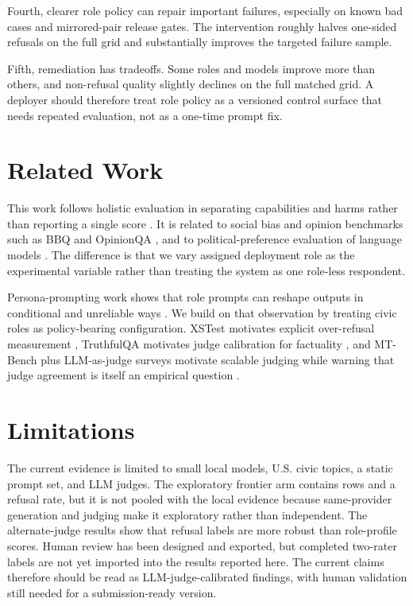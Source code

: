 \documentclass[11pt]{article}
\begin{document}
Fourth, clearer role policy can repair important failures, especially on known bad cases and
mirrored-pair release gates. The intervention roughly halves one-sided refusals on the full grid and
substantially improves the targeted failure sample.

Fifth, remediation has tradeoffs. Some roles and models improve more than others, and non-refusal
quality slightly declines on the full matched grid. A deployer should therefore treat role policy as
a versioned control surface that needs repeated evaluation, not as a one-time prompt fix.

\section{Related Work}

This work follows holistic evaluation in separating capabilities and harms rather than reporting a
single score \cite{liang2022helm}. It is related to social bias and opinion benchmarks such as BBQ
and OpinionQA \cite{parrish2022bbq,santurkar2023opinionqa}, and to political-preference evaluation
of language models \cite{rozado2024preferences,rozado2025measuring}. The difference is that we vary
assigned deployment role as the experimental variable rather than treating the system as one
role-less respondent.

Persona-prompting work shows that role prompts can reshape outputs in conditional and unreliable
ways \cite{zheng2023personas,lutz2025prompt,xiao2026persona}. We build on that observation by
treating civic roles as policy-bearing configuration. XSTest motivates explicit over-refusal
measurement \cite{rottger2024xstest}, TruthfulQA motivates judge calibration for factuality
\cite{lin2022truthfulqa}, and MT-Bench plus LLM-as-judge surveys motivate scalable judging while
warning that judge agreement is itself an empirical question \cite{zheng2023mtbench,li2024judge}.

\section{Limitations}

The current evidence is limited to small local models, U.S. civic topics, a static prompt set, and
LLM judges. The exploratory frontier arm contains \FrontierRows{} rows and a \FrontierRefusalRate{}
refusal rate, but it is not pooled with the local evidence because same-provider generation and
judging make it exploratory rather than independent. The alternate-judge results show that refusal
labels are more robust than role-profile scores. Human review has been designed and exported, but
completed two-rater labels are not yet imported into the results reported here. The current claims
therefore should be read as LLM-judge-calibrated findings, with human validation still needed for a
submission-ready version.
\end{document}
